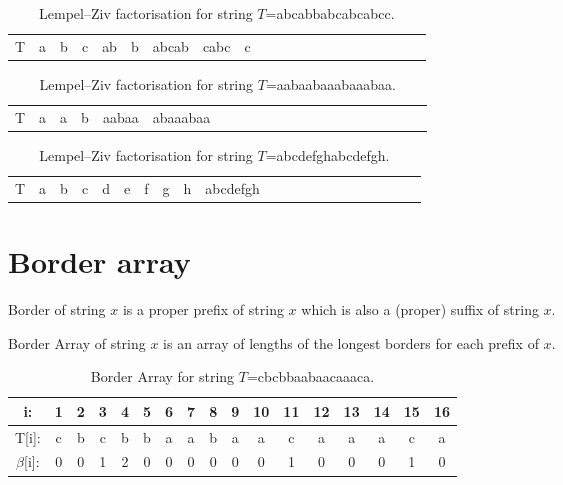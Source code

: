 \begin{table}[h]
  \footnotesize
  \begin{tabular}{c|cccccccccccccccccccc}
    T & a & b & c & ab & b & abcab & cabc & c
  \end{tabular}
  \caption{Lempel--Ziv factorisation for string $T$=abcabbabcabcabcc.}
\end{table}

\begin{table}[h]
  \footnotesize
  \begin{tabular}{c|cccccccccccccccccccc}
    T & a & a & b & aabaa & abaaabaa 
  \end{tabular}
  \caption{Lempel--Ziv factorisation for string $T$=aabaabaaabaaabaa.}
\end{table}

\begin{table}[h]
  \footnotesize
  \begin{tabular}{c|cccccccccccccccccccc}
    T & a & b & c & d & e & f & g & h & abcdefgh
  \end{tabular}
  \caption{Lempel--Ziv factorisation for string $T$=abcdefghabcdefgh.}
\end{table}

\section{Border array}

\begin{dt}{Border}
  of string $x$ is a proper prefix of string $x$ which is also a (proper) suffix of string $x$.
\end{dt}

\begin{dt}{Border Array}
  of string $x$ is an array of lengths of the longest borders for each prefix of $x$.
\end{dt}

\begin{table}[h]
  \footnotesize
  \begin{tabular}{c|cccccccccccccccc}
    i: & 1 & 2 & 3 & 4 & 5 & 6 & 7 & 8 & 9 & 10 & 11 & 12 & 13 & 14 & 15 & 16\\
    \hline
    T[i]: & c & b & c & b & b & a & a & b & a & a & c & a & a & a & c & a\\
    \hline
    $\beta$[i]: & 0 & 0 & 1 & 2 & 0 & 0 & 0 & 0 & 0 & 0 & 1 & 0 & 0 & 0 & 1 & 0
  \end{tabular}
  \caption{Border Array for string $T$=cbcbbaabaacaaaca.}
\end{table}

